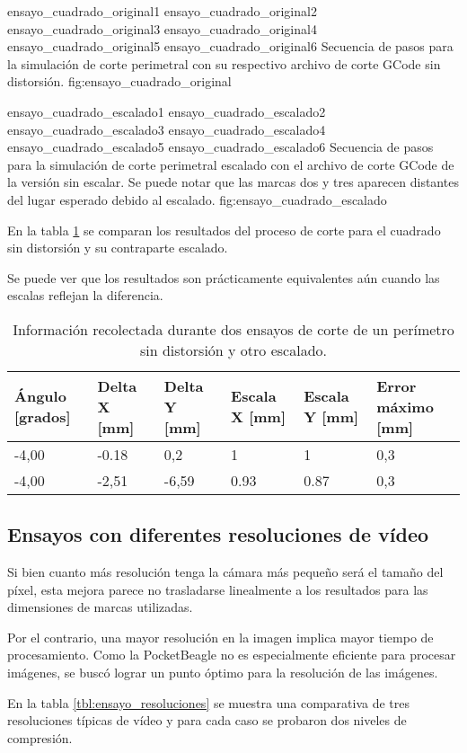    \subfigthreethree
      {ensayo_cuadrado_original1}
      {ensayo_cuadrado_original2}
      {ensayo_cuadrado_original3}
      {ensayo_cuadrado_original4}
      {ensayo_cuadrado_original5}
      {ensayo_cuadrado_original6}
      {Secuencia de pasos para la simulación de corte perimetral con su respectivo archivo de corte GCode sin distorsión.}
      {fig:ensayo_cuadrado_original}


   \subfigthreethree
      {ensayo_cuadrado_escalado1}
      {ensayo_cuadrado_escalado2}
      {ensayo_cuadrado_escalado3}
      {ensayo_cuadrado_escalado4}
      {ensayo_cuadrado_escalado5}
      {ensayo_cuadrado_escalado6}
      {Secuencia de pasos para la simulación de corte perimetral escalado con el archivo de corte GCode de la versión sin escalar. Se puede notar que las marcas dos y tres aparecen distantes del lugar esperado debido al escalado.}
      {fig:ensayo_cuadrado_escalado}


      En la tabla \ref{tbl:ensayo_escalado} se comparan los resultados del proceso de corte para el cuadrado sin distorsión y su contraparte escalado.\par
      Se puede ver que los resultados son prácticamente equivalentes aún cuando las escalas reflejan la diferencia.

      \begin{table}[!ht]
         \centering
         \caption[Ensayos de corte simulado escalado.]{Información recolectada durante dos ensayos de corte de un perímetro sin distorsión y otro escalado.}
         \begin{tabular}[!ht]{m{1.6cm}m{1.6cm}m{1.6cm}m{1.6cm}m{1.6cm}m{1.6cm}}
            \toprule
            \textbf{Ángulo [grados]} & \textbf{Delta X [mm]} & \textbf{Delta Y [mm]} & \textbf{Escala X [mm]} & \textbf{Escala Y [mm]} & \textbf{Error máximo [mm]}\\
            \midrule
            {-4,00}& {-0.18}& {0,2}   & {1}    & {1}    & {0,3}\\
            {-4,00}& {-2,51}& {-6,59} & {0.93} & {0.87} & {0,3}\\
            \bottomrule
         \end{tabular}
         \label{tbl:ensayo_escalado}
      \end{table}

\subsection{Ensayos con diferentes resoluciones de vídeo}
Si bien cuanto más resolución tenga la cámara más pequeño será el tamaño del píxel, esta mejora parece no trasladarse linealmente a los resultados para las dimensiones de marcas utilizadas.\par
Por el contrario, una mayor resolución en la imagen implica mayor tiempo de procesamiento. Como la PocketBeagle no es especialmente eficiente para procesar imágenes, se buscó lograr un punto óptimo para la resolución de las imágenes.\par
En la tabla \ref{tbl:ensayo_resoluciones} se muestra una comparativa de tres resoluciones típicas de vídeo y para cada caso se probaron dos niveles de compresión.\par

